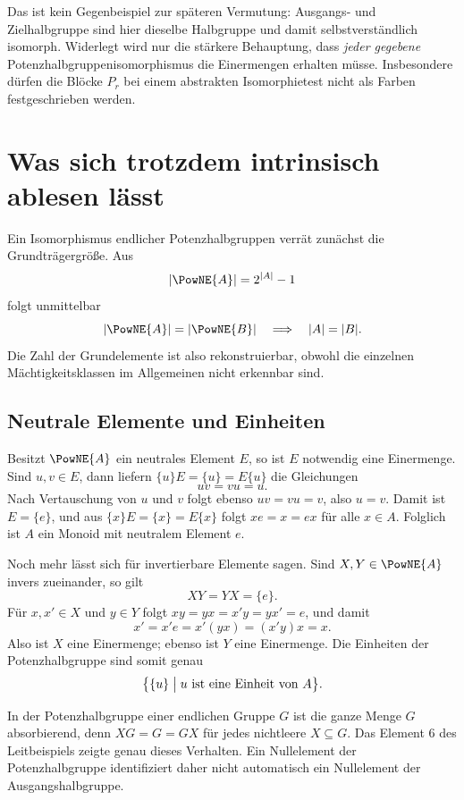 \documentclass[main.tex]{subfiles}
\begin{document}
Das ist kein Gegenbeispiel zur späteren Vermutung: Ausgangs- und
Zielhalbgruppe sind hier dieselbe Halbgruppe und damit selbstverständlich
isomorph.  Widerlegt wird nur die stärkere Behauptung, dass
\emph{jeder gegebene} Potenzhalbgruppenisomorphismus die Einermengen erhalten
müsse.  Insbesondere dürfen die Blöcke \(P_r\) bei einem abstrakten
Isomorphietest nicht als Farben festgeschrieben werden.

\section{Was sich trotzdem intrinsisch ablesen lässt}

Ein Isomorphismus endlicher Potenzhalbgruppen verrät zunächst die
Grundträgergröße.  Aus
\[
  |\PowNE{A}|=2^{|A|}-1
\]
folgt unmittelbar
\[
  |\PowNE{A}|=|\PowNE{B}|
  \quad\Longrightarrow\quad
  |A|=|B|.
\]
Die Zahl der Grundelemente ist also rekonstruierbar, obwohl die einzelnen
Mächtigkeitsklassen im Allgemeinen nicht erkennbar sind.

\subsection{Neutrale Elemente und Einheiten}

Besitzt \(\PowNE{A}\) ein neutrales Element \(E\), so ist \(E\) notwendig
eine Einermenge.  Sind \(u,v\in E\), dann liefern
\(\{u\}E=\{u\}=E\{u\}\) die Gleichungen
\[
  uv=vu=u.
\]
Nach Vertauschung von \(u\) und \(v\) folgt ebenso \(uv=vu=v\), also
\(u=v\).  Damit ist \(E=\{e\}\), und aus
\(\{x\}E=\{x\}=E\{x\}\) folgt \(xe=x=ex\) für alle \(x\in A\).
Folglich ist \(A\) ein Monoid mit neutralem Element \(e\).

Noch mehr lässt sich für invertierbare Elemente sagen.  Sind
\(X,Y\in\PowNE{A}\) invers zueinander, so gilt
\[
  XY=YX=\{e\}.
\]
Für \(x,x'\in X\) und \(y\in Y\) folgt \(xy=yx=x'y=yx'=e\), und damit
\[
  x'=x'e=x'(yx)=(x'y)x=x.
\]
Also ist \(X\) eine Einermenge; ebenso ist \(Y\) eine Einermenge.  Die
Einheiten der Potenzhalbgruppe sind somit genau
\[
  \bigl\{\{u\}\bigm|u\text{ ist eine Einheit von }A\bigr\}.
\]

\begin{remark}
In der Potenzhalbgruppe einer endlichen Gruppe \(G\) ist die ganze Menge
\(G\) absorbierend, denn \(XG=G=GX\) für jedes nichtleere \(X\subseteq G\).
Das Element \(6\) des Leitbeispiels zeigte genau dieses Verhalten.  Ein
Nullelement der Potenzhalbgruppe identifiziert daher nicht automatisch ein
Nullelement der Ausgangshalbgruppe.
\end{remark}
\end{document}

